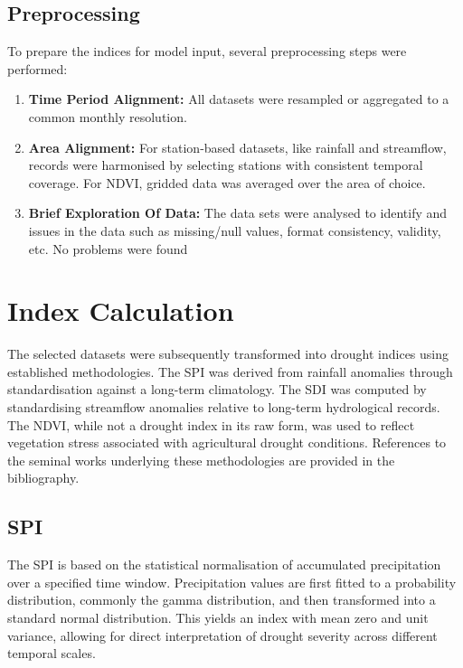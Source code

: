 \subsection{Preprocessing}


To prepare the indices for model input, several preprocessing steps were performed:  
\begin{enumerate}
    \item \textbf{Time Period Alignment:} All datasets were resampled or aggregated to a common monthly resolution.  
    \item \textbf{Area Alignment:} For station-based datasets, like rainfall and streamflow, records were harmonised by selecting stations with consistent temporal coverage. For NDVI, gridded data was averaged over the area of choice. 
    \item \textbf{Brief Exploration Of Data:} The data sets were analysed to identify and issues in the data such as missing/null values, format consistency, validity, etc. No problems were found
\end{enumerate}

\section{Index Calculation}
\label{sec:index-calc}

The selected datasets were subsequently transformed into drought indices using established methodologies. The SPI was derived from rainfall anomalies through standardisation against a long-term climatology. The SDI was computed by standardising streamflow anomalies relative to long-term hydrological records. The NDVI, while not a drought index in its raw form, was used to reflect vegetation stress associated with agricultural drought conditions. References to the seminal works underlying these methodologies are provided in the bibliography.

\subsection{SPI}

The SPI is based on the statistical normalisation of accumulated precipitation over a specified time window. Precipitation values are first fitted to a probability distribution, commonly the gamma distribution, and then transformed into a standard normal distribution. This yields an index with mean zero and unit variance, allowing for direct interpretation of drought severity across different temporal scales.

